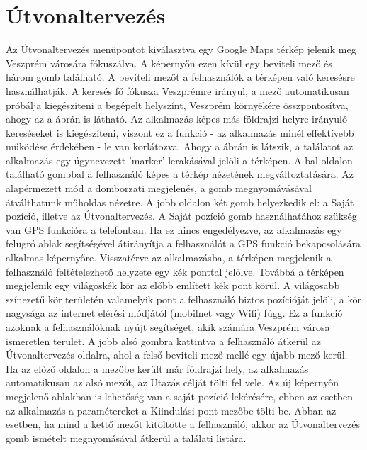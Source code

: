 \section {Útvonaltervezés}
\label {utvonalterv}
Az Útvonaltervezés menüpontot kiválasztva egy Google Maps térkép jelenik meg Veszprém városára fókuszálva.
A képernyőn ezen kívül egy beviteli mező és három gomb található.
A beviteli mezőt a felhasználók a térképen való keresésre használhatják.
A keresés fő fókusza Veszprémre irányul, a mező automatikusan próbálja kiegészíteni a begépelt helyszínt, Veszprém környékére összpontosítva, ahogy az a  ábrán is látható.
Az alkalmazás képes más földrajzi helyre irányuló kereséseket is kiegészíteni, viszont ez a funkció - az alkalmazás minél effektívebb működése érdekében - le van korlátozva.
Ahogy a  ábrán is látszik, a találatot az alkalmazás egy úgynevezett 'marker' lerakásával jelöli a térképen.
A bal oldalon található gombbal a felhasználó képes a térkép nézetének megváltoztatására.
Az alapérmezett mód a domborzati megjelenés, a gomb megnyomávásával átválthatunk műholdas nézetre.
A jobb oldalon két gomb helyezkedik el: a Saját pozíció, illetve az Útvonaltervezés.
A Saját pozíció gomb használhatához szükség van GPS funkcióra a telefonban.
Ha ez nincs engedélyezve, az alkalmazás egy felugró ablak segítségével átirányítja a felhasználót a GPS funkció bekapcsolására alkalmas képernyőre.
Visszatérve az alkalmazásba, a térképen megjelenik a felhasználó feltételezhető helyzete egy kék ponttal jelölve.
Továbbá a térképen megjelenik egy világoskék kör az előbb említett kék pont körül.
A világosabb színezetű kör területén valamelyik pont a felhasználó biztos pozícióját jelöli, a kör nagysága az internet elérési módjától (mobilnet vagy Wifi) függ.
Ez a funkció azoknak a felhasználóknak nyújt segítséget, akik számára Veszprém városa ismeretlen terület.
A jobb alsó gombra kattintva a felhasználó átkerül az Útvonaltervezés oldalra, ahol a felső beviteli mező mellé egy újabb mező kerül.
Ha az előző oldalon a mezőbe került már földrajzi hely, az alkalmazás automatikusan az alsó mezőt, az Utazás célját tölti fel vele.
Az új képernyőn megjelenő ablakban is lehetőség van a saját pozíció lekérésére, ebben az esetben az alkalmazás a paramétereket a Kiindulási pont mezőbe tölti be.
Abban az esetben, ha mind a kettő mezőt kitöltötte a felhasználó, akkor az Útvonaltervezés gomb ismételt megnyomásával átkerül a találati listára.
